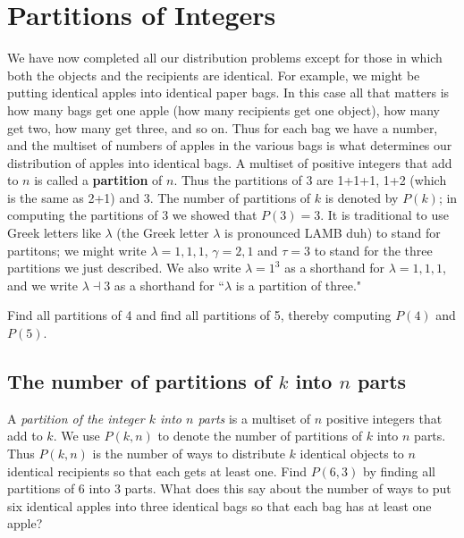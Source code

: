 {\begin{enumerate}
\end{enumerate}
\ep
\section{Partitions of Integers}  We have now completed all our
distribution problems except for those in which both the objects and the
recipients are identical.  For example, we might be putting identical
apples into identical paper bags.  In this case all that matters is how
many bags get one apple (how many recipients get one object), how many
get two, how many get three, and so on.  Thus for each bag we have a
number, and the multiset of numbers of apples in the various bags is
what determines our distribution of apples into identical bags.  A
multiset of positive integers that add to $n$ is called a {\bf
partition} of
$n$.  Thus the partitions of 3 are 1+1+1, 1+2 (which is the same as 2+1)
and 3.  The number of partitions of $k$ is denoted by $P(k)$; in
computing the partitions of 3 we showed that $P(3) = 3$.  It is
traditional to use Greek letters like $\lambda$ (the Greek letter
$\lambda$ is pronounced LAMB duh)  to stand for partitons;
we might write $\lambda= 1,1,1$, $\gamma= 2,1$ and $\tau = 3$
to stand for the three partitions we just described.  We also write
$\lambda = 1^3$ as a shorthand for $\lambda = 1,1,1$, and we write
$\lambda \dashv 3$ as a shorthand for ``$\lambda$ is a partition of
three."

\bp
\itemm Find all partitions of 4 and find all partitions of 5, thereby
computing $P(4)$ and $P(5)$.
\ep

\subsection{The number of partitions of $k$ into $n$ parts}
 A {\em partition of the integer $k$ into $n$ parts} is a multiset of
$n$ positive integers that add to $k$.  We use $P(k,n)$ to denote the
number of partitions of $k$ into $n$ parts.  Thus $P(k,n)$ is the number
of ways to distribute $k$ identical objects to $n$ identical recipients
so that each gets at least one.  
\bp
\itemm Find
$P(6,3)$ by finding all partitions of 6 into 3 parts.  What does this say
about the number of ways to put six identical apples into three identical
bags so that each bag has at least one apple? 
\ep

}
